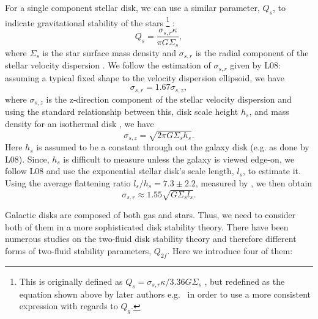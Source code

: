 \documentclass[12pt,preprint]{aastex}
\begin{document}
For a single component stellar disk, we can  use a similar  parameter, $Q_s$, to indicate gravitational stability of the stars \footnote{This is originally defined as $Q_{s}=\sigma_{s,r} \kappa/3.36 G \Sigma_s$ \citep{too64,bin08}, but redefined as the equation shown above by later authors e.g.\ \citet{wan94,raf01}  in order to use a more consistent expression with regards to $Q_g$.} : 
\begin{equation}
Q_{s}=\frac{\sigma_{s,r} \kappa}{\pi G \Sigma_s}, 
\label{Qs}
\end{equation}
where $\Sigma_s$ is the star surface mass density and $\sigma_{s,r}$ is the radial component of the stellar velocity dispersion \citep{jog84,wan94,raf01}. We follow the estimation of $\sigma_{s,r}$ given by L08: assuming a typical fixed shape to the velocity dispersion ellipsoid, we have
\begin{equation}
\sigma_{s,r}=1.67\sigma_{s,z}, 
\end{equation}
where $\sigma_{s,z}$ is the z-direction component of the stellar velocity dispersion and using the standard relationship between this, disk scale height $h_s$, and mass density for an isothermal disk \citep[e.g.][]{vdk88}, we have
\begin{equation}
\label{sigma_sz}
\sigma_{s,z}=\sqrt{2\pi G \Sigma_s h_s}.
\end{equation}
Here $h_s$ is assumed to be
a constant through out the galaxy disk (e.g. as done by L08). Since,
$h_s$ is difficult to measure unless the galaxy is viewed edge-on, we follow L08 and use the exponential stellar disk's scale length, $l_s$, to estimate it. Using the average flattening ratio $l_s/h_s=7.3\pm2.2$, measured by \citet{kre02}, we then obtain 
\begin{equation}
\sigma_{s,r}\approx 1.55 \sqrt{G \Sigma_s l_s}.
\end{equation}

Galactic disks are composed of both gas and stars. 
Thus, we need to consider both of them in a more sophisticated disk stability theory.
There have been numerous studies on the two-fluid disk stability theory and therefore
different forms of two-fluid stability parameters, $  Q_{2f}$. 
Here we introduce four of them:
 
\end{document}
